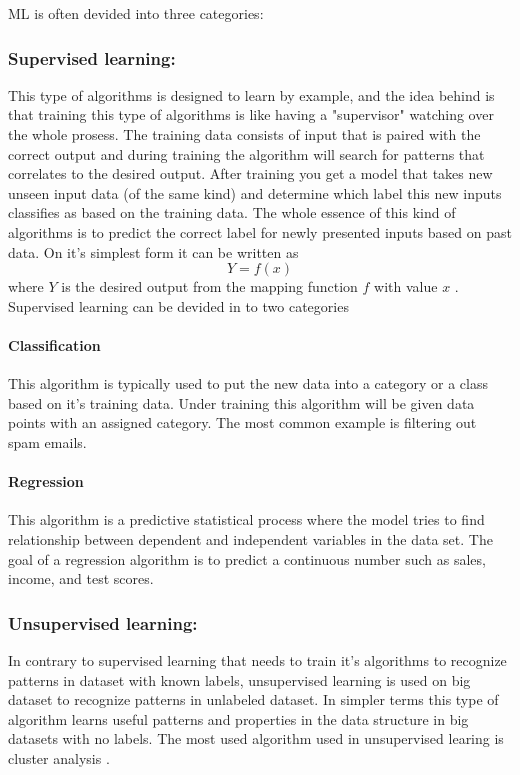\documentclass[conference]{IEEEtran}
\begin{document}
	 ML is often devided into three categories:
		\subsubsection{Supervised learning:}
			This type of algorithms is designed to learn by example, and the idea behind is that training this type of algorithms is like having
			a "supervisor" watching over the whole prosess. The training data consists of input that is paired with the correct output and during
			training the algorithm will search for patterns that correlates to the desired output. After training you get a model that takes new
			unseen input data (of the same kind) and determine which label this new inputs classifies as based on the training data. The whole essence
			of this kind of algorithms is to predict the correct label for newly presented inputs based on past data. On it's simplest form it can be written as
			$$ Y = f(x) $$ where $Y$ is the desired output from the mapping function $f$ with value $x$ \cite{towardsDataSience:SL}. Supervised learning can be devided in to two categories
			
			\paragraph{Classification}
			This algorithm is typically used to put the new data into a category or a class based on it's training data. Under training this algorithm
			will be given data points with an assigned category. The most common example is filtering out spam emails.
			
			\paragraph{Regression}
			This algorithm is a predictive statistical process where the model tries to find relationship between dependent and independent variables
			in the data set. The goal of a regression algorithm is to predict a continuous number such as sales, income, and test scores.
		       

		\subsubsection{Unsupervised learning:}
			In contrary to supervised learning that needs to train it's algorithms to recognize patterns in dataset with known labels, unsupervised learning
			is used on big dataset to recognize patterns in unlabeled dataset. In simpler terms this type of algorithm learns useful patterns and properties in
			the data structure in big datasets with no labels. The most used algorithm used in unsupervised learing is cluster analysis \cite{deepAI:UL} \cite{Wiki:UL}.
\end{document}
